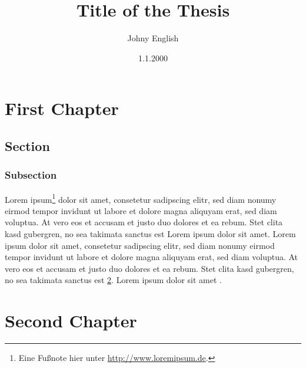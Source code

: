 \documentclass[ngerman]{tudscrreprt}
\begin{document}


\subject{bachelor}
\date{1.1.2000}

\title{
  Title of the Thesis
}

\author{
  Johny English
}

\maketitle


\tableofcontents

\chapter{First Chapter}

\section{Section}

\subsection{Subsection}

Lorem ipsum\footnote{Eine Fußnote hier unter \url{http://www.loremipsum.de}.} dolor sit amet, consetetur sadipscing elitr, sed diam nonumy eirmod tempor invidunt ut labore et dolore magna aliquyam erat, sed diam voluptua. At vero eos et accusam et justo duo dolores et ea rebum. Stet clita kasd gubergren, no sea takimata sanctus est Lorem ipsum dolor sit amet. Lorem ipsum dolor sit amet, consetetur sadipscing elitr, sed diam nonumy eirmod tempor invidunt ut labore et dolore magna aliquyam erat, sed diam voluptua. At vero eos et accusam et justo duo dolores et ea rebum. Stet clita kasd gubergren, no sea takimata sanctus est \ref{chapter:second-chapter}. Lorem ipsum dolor sit amet \cite{Mai12}.

\chapter{Second Chapter}
\label{chapter:second-chapter}




\confirmation
\end{document}
